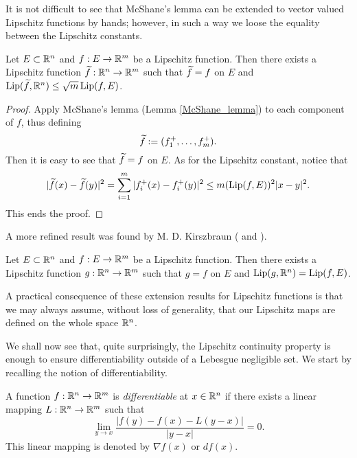 It is not difficult to see that McShane's lemma can be extended to vector valued Lipschitz functions by hands; however, in such a way we loose the equality between the Lipschitz constants.

\begin{corollary}
Let $E \subset \mathbb{R}^{n}$ and $f: E \to \mathbb{R}^{m}$ be a Lipschitz function. Then there exists a Lipschitz function $\widetilde{ f} : \mathbb{R}^{n} \to \mathbb{R}^{m}$ such that $\widetilde{ f} = f$ on $E$ and $\operatorname{Lip}(\widetilde{ f}, \mathbb{R}^{n}) \le \sqrt{m} \operatorname{Lip}(f, E)$.
\end{corollary}
\begin{proof}
Apply McShane's lemma (Lemma \ref{McShane_lemma}) to each component of $f$, thus defining
\begin{equation*}
\widetilde{ f} := (f_{1}^{+}, \dots, f_{m}^{+}).
\end{equation*}
Then it is easy to see that $\widetilde{ f}= f$ on $E$. As for the Lipschitz constant, notice that
\begin{equation*}
|\widetilde{ f}(x) - \widetilde{ f}(y)|^{2} = \sum_{i = 1}^{m}|f_{i}^{+}(x) - f_{i}^{+}(y)|^{2} \le m (\operatorname{Lip}(f, E))^{2} |x - y|^2.
\end{equation*}
This ends the proof.
\end{proof}

A more refined result was found by M. D. Kirszbraun (\cite[2.10.43]{Fe} and \cite[Theorem I.7.2]{maggi2012sets}).

\begin{theorem}
Let $E \subset \mathbb{R}^{n}$ and $f: E \to \mathbb{R}^{m}$ be a Lipschitz function. Then there exists a Lipschitz function $g: \mathbb{R}^{n} \to \mathbb{R}^{m}$ such that $g = f$ on $E$ and $\operatorname{Lip}(g, \mathbb{R}^{n}) = \operatorname{Lip}(f, E)$.
\end{theorem}

A practical consequence of these extension results for Lipschitz functions is that we may always assume, without loss of generality, that our Lipschitz maps are defined on the whole space $\mathbb{R}^{n}$.

We shall now see that, quite surprisingly, the Lipschitz continuity property is enough to ensure differentiability outside of a Lebesgue negligible set. We start by recalling the notion of differentiability.

\begin{definition}
A function $f : \mathbb{R}^{n} \to \mathbb{R}^{m}$ is {\em differentiable} at $x \in \mathbb{R}^{n}$ if there exists a linear mapping $L: \mathbb{R}^{n} \to \mathbb{R}^{m}$ such that
\begin{equation*}
\lim_{y \to x} \frac{|f(y) - f(x) - L(y - x)|}{|y - x|} = 0.
\end{equation*}
This linear mapping is denoted by $\nabla f(x)$ or $d f(x)$.
\end{definition}

